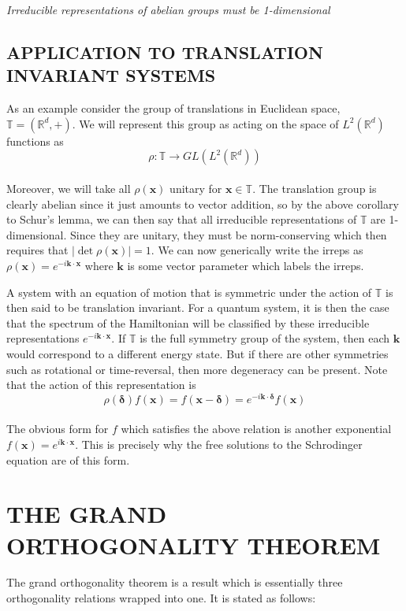 \documentclass[9 pt]{report}
\def\*#1{\boldsymbol{#1}}
\begin{document}
\begin{tcolorbox} 
	\begin{center}
	\emph{Irreducible representations of abelian groups must be 1-dimensional}
	\end{center}
\end{tcolorbox}

\hspace{0.5cm}

{\centering
\subsection*{APPLICATION TO TRANSLATION INVARIANT SYSTEMS}}

As an example consider the group of translations in Euclidean space, $\mathbb{T} = (\mathbb{R}^d, +)$. We will represent this group as acting on the space of $L^2(\mathbb{R}^d)$ functions as 
$$\rho : \mathbb{T}\rightarrow GL(L^2(\mathbb{R}^d))$$
\\
Moreover, we will take all $\rho(\*x)$ unitary for $\*x\in\mathbb{T}$. The translation group is clearly abelian since it just amounts to vector addition, so by the above corollary to Schur's lemma, we can then say that all irreducible representations of $\mathbb{T}$ are 1-dimensional. Since they are unitary, they must be norm-conserving which then requires that $|\det \rho(\*x)|=1$. We can now generically write the irreps as $\rho(\*x)=e^{-i\*k\cdot \*x}$ where $\*k$ is some vector parameter which labels the irreps. 

A system with an equation of motion that is symmetric under the action of $\mathbb{T}$ is then said to be translation invariant. For a quantum system, it is then the case that the spectrum of the Hamiltonian will be classified by these irreducible representations $e^{-i\*k\cdot\*x}$. If $\mathbb{T}$ is the full symmetry group of the system, then each $\*k$ would correspond to a different energy state. But if there are other symmetries such as rotational or time-reversal, then more degeneracy can be present. Note that the action of this representation is 
$$ \rho(\*\delta)f(\*x) = f(\*x-\*\delta) = e^{-i\*k\cdot\*\delta}f(\*x) $$
\\
The obvious form for $f$ which satisfies the above relation is another exponential $f(\*x)=e^{i\*k\cdot\*x}$. This is precisely why the free solutions to the Schrodinger equation are of this form.

\pagebreak

{\centering
\section*{THE GRAND ORTHOGONALITY THEOREM}}
The grand orthogonality theorem is a result which is essentially three orthogonality relations wrapped into one. It is stated as follows:
\end{document}
